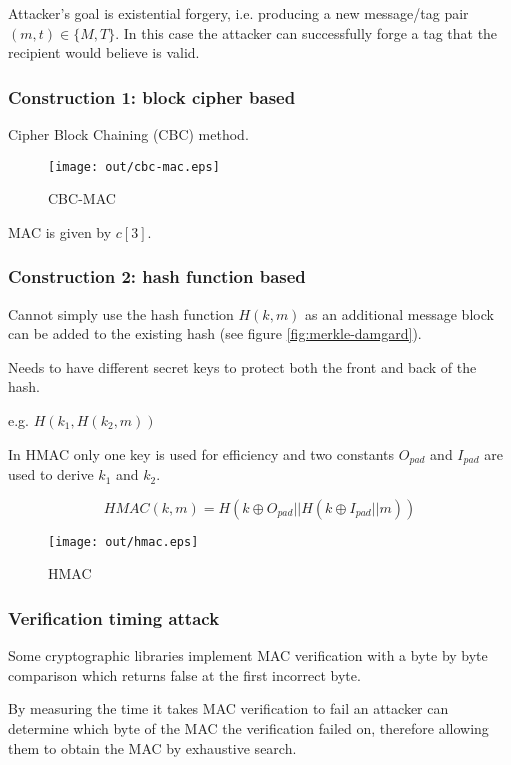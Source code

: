\documentclass[a4paper]{article}
\begin{document}
Attacker's goal is existential forgery, i.e. producing a new message/tag pair
$(m, t) \in \{M, T\}$. In this case the attacker can successfully forge a tag
that the recipient would believe is valid.

\subsubsection{Construction 1: block cipher based}

Cipher Block Chaining (CBC) method.

\begin{figure}[h!]
  \centering
  \texttt{[image: out/cbc-mac.eps]}
  \caption{CBC-MAC}
  \label{fig:cbc-mac}
\end{figure}
\FloatBarrier

MAC is given by $c[3]$.

\subsubsection{Construction 2: hash function based}

Cannot simply use the hash function $H(k, m)$ as an additional message block can
be added to the existing hash (see figure \ref{fig:merkle-damgard}).


Needs to have different secret keys to protect both the front and back of the
hash.

e.g. $H(k_{1}, H(k_{2}, m))$

In HMAC only one key is used for efficiency and two constants $O_{pad}$ and
$I_{pad}$ are used to derive $k_{1}$ and $k_{2}$.

\[
  HMAC(k, m) = H(k \oplus O_{pad} || H(k \oplus I_{pad} || m))
\]

\begin{figure}[h!]
  \centering
  \texttt{[image: out/hmac.eps]}
  \caption{HMAC}
  \label{fig:hmac}
\end{figure}
\FloatBarrier

\subsubsection{Verification timing attack}

Some cryptographic libraries implement MAC verification with a byte by byte
comparison which returns false at the first incorrect byte.

By measuring the time it takes MAC verification to fail an attacker can
determine which byte of the MAC the verification failed on, therefore allowing
them to obtain the MAC by exhaustive search.
\end{document}
